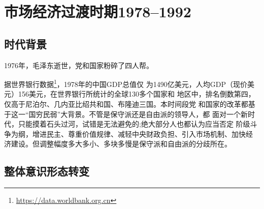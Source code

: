 \chapter{市场经济过渡时期1978--1992}
\label{chap:1978}

\section{时代背景}

1976年，毛泽东逝世，党和国家粉碎了四人帮。

据世界银行数据\footnote{\url{https://data.worldbank.org.cn}}，1978年的中国GDP总值仅
为1490亿美元，人均GDP（现价美元）156美元，在世界银行所统计的全球130多个国家和
地区中，排名倒数第四，仅高于尼泊尔、几内亚比绍共和国、布隆迪三国。本时间段党
和国家的改革都基于这一“国穷民弱”大背景。不管是保守派还是自由派的领导人，都
面对一个新时代，只能摸着石头过河，试错是无法避免的;绝大部分人也都认为应当否定
阶级斗争为纲，增进民主、尊重价值规律、减轻中央财政负担、引入市场机制、加快经
济建设。但调整幅度多大多小、多块多慢是保守派和自由派的分歧所在。

\section{整体意识形态转变}

